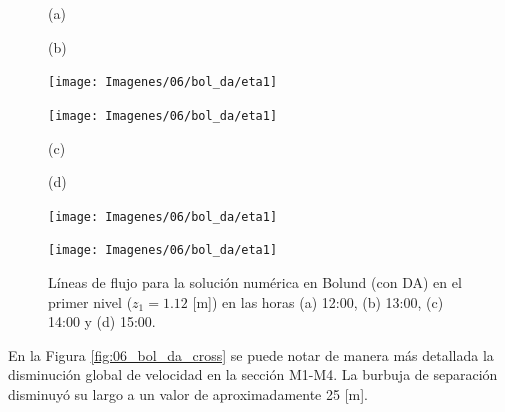 \begin{figure}[H]
	\begin{minipage}{0.5\linewidth}
		\centering
		\hspace{1cm}(a)
	\end{minipage}%
	\begin{minipage}{0.5\linewidth}
		\centering
		\hspace{-1cm}(b)
	\end{minipage}%
	
	\begin{minipage}{0.5\linewidth}
		\centering
		\texttt{[image: Imagenes/06/bol\_da/eta1]}%
	\end{minipage}%
	\begin{minipage}{0.5\linewidth}
		\centering
		\texttt{[image: Imagenes/06/bol\_da/eta1]}%
	\end{minipage}%
	\vspace{1mm}
	
	\begin{minipage}{0.5\linewidth}
		\centering
		\hspace{1cm}(c)
	\end{minipage}%
	\begin{minipage}{0.5\linewidth}
		\centering
		\hspace{-1cm}(d)
	\end{minipage}%
	
	\begin{minipage}{0.5\linewidth}
		\centering
		\texttt{[image: Imagenes/06/bol\_da/eta1]}%
	\end{minipage}%
	\begin{minipage}{0.5\linewidth}
		\centering
		\texttt{[image: Imagenes/06/bol\_da/eta1]}%
	\end{minipage}%
	\caption{Líneas de flujo para la solución numérica en Bolund (con DA) en el primer nivel ($z_1 = 1.12$ [m]) en las horas (a) 12:00, (b) 13:00, (c) 14:00 y (d) 15:00.}
	\label{fig:06_bol_da_st}
\end{figure}
En la Figura \ref{fig:06_bol_da_cross} se puede notar de manera más detallada la disminución global de velocidad en la sección M1-M4. La burbuja de separación disminuyó su largo a un valor de aproximadamente 25 [m].

